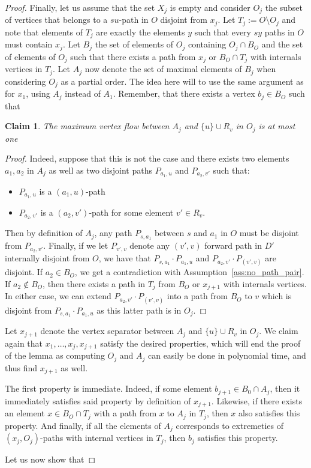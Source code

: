 \documentclass[utf8,11pt]{article}
\theoremstyle{plain}
\newtheorem{claim}{Claim}[theorem]
\theoremstyle{definition}
\begin{document}
\begin{proof}
Finally, let us assume that the set $X_j$ is empty and consider $O_j$ the subset of vertices that belongs to a $su$-path in $O$ disjoint from $x_j$. Let $T_j := O \setminus O_j$ and note that elements of $T_j$ are exactly the elements $y$ such that every $sy$ paths in $O$ must contain $x_j$. Let $B_j$ the set of elements of $O_j$ containing $O_j \cap B_O$ and the set of elements of $O_j$ such that there exists a path from $x_j$ or $B_O \cap T_j$ with internals vertices in $T_j$. Let $A_j$ now denote the set of maximal elements of $B_j$ when considering $O_j$ as a partial order. The idea here will to use the same argument as for $x_1$, using $A_j$ instead of $A_1$. Remember, that there exists a vertex $b_j \in B_O$ such that 

\begin{claim}
    The maximum vertex flow between $A_j$ and $\{u\} \cup R_v$ in $O_j$ is at most one
\end{claim}

\begin{proof}
Indeed, suppose that this is not the case and there exists two elements $a_1, a_2$ in $A_j$ as well as two disjoint paths $P_{a_1, u}$ and $P_{a_2,v'}$ such that: 
\begin{itemize}
    \item $P_{a_1, u}$ is a $(a_1,u)$-path 
    \item $P_{a_2,v'}$ is a $(a_2, v')$-path for some element $v' \in R_v$.
\end{itemize}

Then by definition of $A_j$, any path $P_{s,a_1}$ between $s$ and $a_1$ in $O$ must be disjoint from $P_{a_2,v'}$. Finally, if we let $P_{v',v}$ denote any $(v',v)$ forward path in $D'$ internally disjoint from $O$, we have that $P_{s, a_1} \cdot P_{a_1,u}$ and $P_{a_2,v'} \cdot P_{(v',v)}$ are disjoint. If $a_2 \in B_O$, we get a contradiction with Assumption~\ref{ass:no_path_pair}.
If $a_2 \not \in B_O$, then there exists a path in $T_j$ from $B_O$ or $x_{j+1}$ 
with internals vertices. In either case, we can extend $P_{a_2,v'} \cdot P_{(v',v)}$ into a path from $B_O$ to $v$ which is disjoint from $P_{s, a_1} \cdot P_{a_1,u}$ as this latter path is in $O_j$. 
\end{proof}    
Let $x_{j+1}$ denote the vertex separator between $A_j$ and $\{u\} \cup R_v$ in $O_j$. We claim again that $x_1, \dots, x_j, x_{j+1}$ satisfy the desired properties, which will end the proof of the lemma as computing $O_j$ and $A_j$ can easily be done in polynomial time, and thus find $x_{j+1}$ as well. 

The first property is immediate. Indeed, if some element $b_{j+1} \in B_0 \cap A_j$, then it immediately satisfies said property by definition of $x_{j+1}$. Likewise, if there exists an element $x \in B_O \cap T_j$ with a path from $x$ to $A_{j}$ in $T_j$, then $x$ also satisfies this property. And finally, if all the elements of $A_j$ corresponds to extremeties of $(x_{j}, O_j)$-paths with internal vertices in $T_j$, then $b_j$ satisfies this property. 

Let us now show that 



\end{proof}
\end{document}
